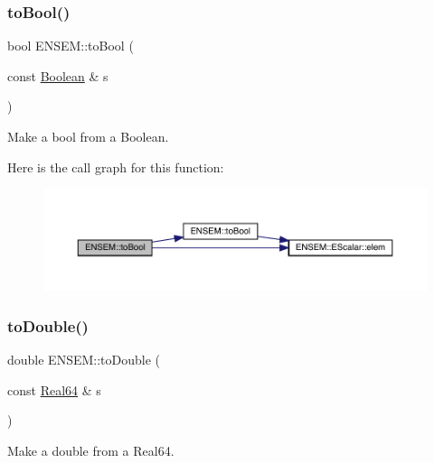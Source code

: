 \subsubsection{\texorpdfstring{toBool()}{toBool()}}
{\footnotesize\ttfamily bool E\+N\+S\+E\+M\+::to\+Bool (\begin{DoxyParamCaption}\item[{const \mbox{\hyperlink{group__defs_ga38f0cd64d26e121e75367986f2d7cd6c}{Boolean}} \&}]{s }\end{DoxyParamCaption})\hspace{0.3cm}{\ttfamily [inline]}}



Make a bool from a Boolean. 

Here is the call graph for this function\+:\nopagebreak
\begin{figure}[H]
\begin{center}
\leavevmode
\includegraphics[width=350pt]{d2/d94/namespaceENSEM_abc04e0e08f1aeecdaca3de8b916ac697_cgraph}
\end{center}
\end{figure}
\mbox{\label{namespaceENSEM_ac48f5951452a687d3b08acfd4b10d874}} 
\subsubsection{\texorpdfstring{toDouble()}{toDouble()}}
{\footnotesize\ttfamily double E\+N\+S\+E\+M\+::to\+Double (\begin{DoxyParamCaption}\item[{const \mbox{\hyperlink{group__defs_gaae0bff35c031375b1ffeb693402496c8}{Real64}} \&}]{s }\end{DoxyParamCaption})\hspace{0.3cm}{\ttfamily [inline]}}



Make a double from a Real64. 

